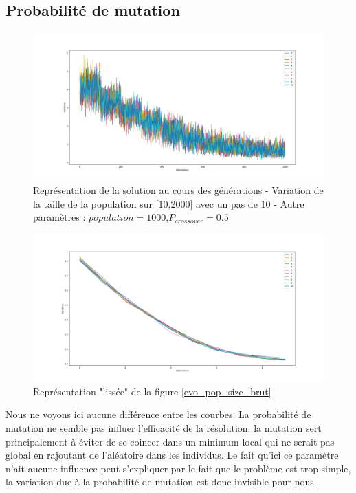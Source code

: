 \documentclass[12pt]{report}
\begin{document}
      \subsection{Probabilité de mutation}

      \begin{figure}[h]
        \centering
        \includegraphics[width=17cm]{img/evo_mutation_brut.png}
        \caption{Représentation de la solution au cours des générations - Variation de la taille de la population sur [10,2000] avec un pas de 10 - Autre paramètres : $population = 1000$,$P_{crossover} = 0.5$}
        \label{evo_mutation_brut}
      \end{figure}

      \begin{figure}[!]
        \centering
        \includegraphics[width=17cm]{img/evo_mutation_moy.png}
        \caption{Représentation "lissée" de la figure \ref{evo_pop_size_brut}}
        \label{evo_mutation_moy}
      \end{figure}

      Nous ne voyons ici aucune différence entre les courbes. La probabilité de mutation ne semble pas influer l'efficacité de la résolution. la mutation sert principalement à éviter de se coincer dans un minimum local qui ne serait pas global en rajoutant de l'aléatoire dans les individus. Le fait qu'ici ce paramètre n'ait aucune influence peut s'expliquer par le fait que le problème est trop simple, la variation due à la probabilité de mutation est donc invisible pour nous.
\end{document}
